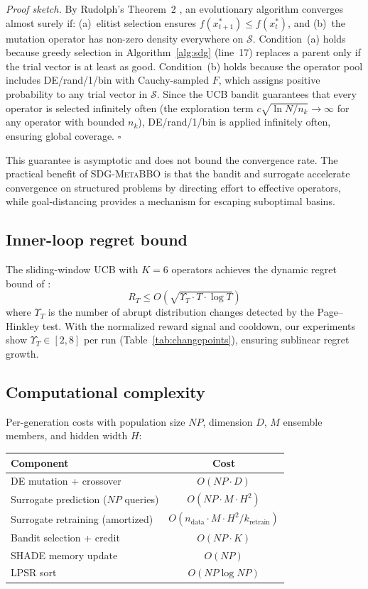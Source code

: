 \documentclass[preprint,12pt,number]{elsarticle}
\newcommand{\sdg}{\textsc{SDG-MetaBBO}}
\newcommand{\xbest}{x^*}
\begin{document}
\textit{Proof sketch.}
By Rudolph's Theorem~2 \cite{Rudolph1994}, an evolutionary algorithm converges almost surely if: (a)~elitist selection ensures $f(\xbest_{t+1}) \leq f(\xbest_t)$, and (b)~the mutation operator has non-zero density everywhere on $\mathcal{S}$. Condition~(a) holds because greedy selection in Algorithm~\ref{alg:sdg} (line~17) replaces a parent only if the trial vector is at least as good. Condition~(b) holds because the operator pool includes DE/rand/1/bin with Cauchy-sampled $F$, which assigns positive probability to any trial vector in $\mathcal{S}$. Since the UCB bandit guarantees that every operator is selected infinitely often (the exploration term $c\sqrt{\ln N / n_k} \to \infty$ for any operator with bounded $n_k$), DE/rand/1/bin is applied infinitely often, ensuring global coverage. $\square$

This guarantee is asymptotic and does not bound the convergence rate. The practical benefit of \sdg{} is that the bandit and surrogate accelerate convergence on structured problems by directing effort to effective operators, while goal-distancing provides a mechanism for escaping suboptimal basins.

\subsection{Inner-loop regret bound}

The sliding-window UCB with $K = 6$ operators achieves the dynamic regret bound of \cite{Garivier2011}:
\begin{equation}
R_T \leq O\left(\sqrt{\Upsilon_T \cdot T \cdot \log T}\right)
\label{eq:regret}
\end{equation}
where $\Upsilon_T$ is the number of abrupt distribution changes detected by the Page--Hinkley test. With the normalized reward signal and cooldown, our experiments show $\Upsilon_T \in [2, 8]$ per run (Table~\ref{tab:changepoints}), ensuring sublinear regret growth.

\subsection{Computational complexity}
\label{sec:complexity}

Per-generation costs with population size $NP$, dimension $D$, $M$ ensemble members, and hidden width $H$:

\begin{center}
\begin{tabular}{lc}
\toprule
Component & Cost \\
\midrule
DE mutation + crossover & $O(NP \cdot D)$ \\
Surrogate prediction ($NP$ queries) & $O(NP \cdot M \cdot H^2)$ \\
Surrogate retraining (amortized) & $O(n_{\text{data}} \cdot M \cdot H^2 / k_{\text{retrain}})$ \\
Bandit selection + credit & $O(NP \cdot K)$ \\
SHADE memory update & $O(NP)$ \\
LPSR sort & $O(NP \log NP)$ \\
\bottomrule
\end{tabular}
\end{center}
\end{document}
